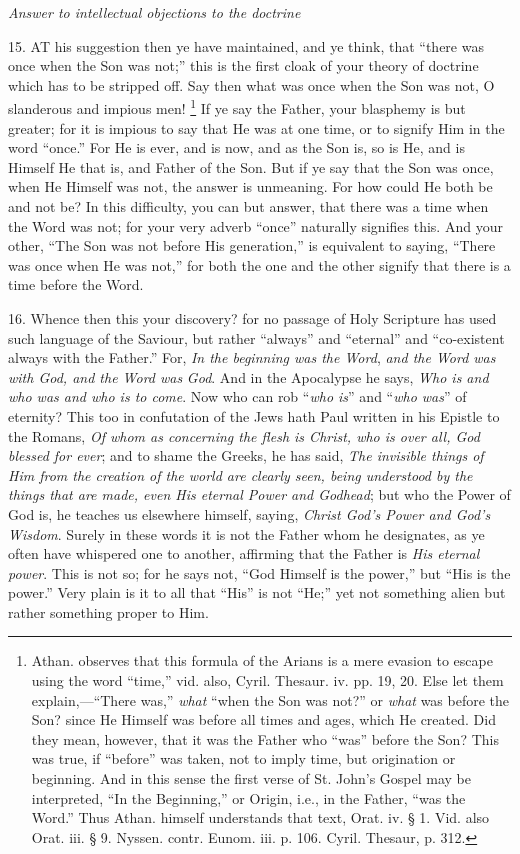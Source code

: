 
\emph{Answer
to intellectual objections to the doctrine}

15. AT
his suggestion then ye have maintained, and ye think, that ``there was
once when the Son was not;'' this is the first cloak of your theory of
doctrine which has to be stripped off. Say then what was once when the
Son was not, O slanderous and impious men! \footnote{Athan. observes that this formula of the Arians is a mere evasion to
escape using the word ``time,'' vid. also, Cyril. Thesaur. iv. pp. 19,
20. Else let them explain,—``There was,'' \emph{what} ``when the Son
was not?'' or \emph{what} was before the Son? since He Himself was
before all times and ages, which He created. Did they mean, however,
that it was the Father who ``was'' before the Son? This was true, if ``before''
was taken, not to imply time, but origination or beginning. And in
this sense the first verse of St. John's Gospel may be interpreted, ``In
the Beginning,'' or Origin, i.e., in the Father, ``was the Word.'' Thus
Athan. himself understands that text, Orat. iv. § 1. Vid. also Orat.
iii. § 9. Nyssen. contr. Eunom. iii. p. 106. Cyril. Thesaur, p. 312.} If ye say the Father, your blasphemy is but greater; for it is
impious to say that He was at one time, or to signify Him in the word ``once.''
For He is ever, and is now, and as the Son is, so is He, and is
Himself He that is, and Father of the Son. But if ye say that the Son
was once, when He Himself was not, the answer is unmeaning. For how
could He both be and not be? In this difficulty, you can but answer,
that there was a time when the Word was not; for your very adverb ``once''
naturally signifies this. And your other, ``The Son was not before His
generation,'' is equivalent to saying, ``There was once when He was not,''
for both the one and the other signify that there is a time before the
Word.

16. Whence then this your
discovery? for no passage of Holy Scripture has used such language of
the Saviour, but rather ``always'' and ``eternal'' and ``co-existent always
with the Father.'' For, \emph{In the beginning was the Word}, \emph{and
the Word was with God, and the Word was} \emph{God}. And in the
Apocalypse he says, \emph{Who is and who was and who is to come}. Now
who can rob ``\emph{who is}'' and ``\emph{who was}'' of eternity? This too
in confutation of the Jews hath Paul written in his Epistle to the
Romans, \emph{Of whom as concerning the flesh is Christ, who is over all,
God blessed for ever}; and to shame the Greeks, he has said, \emph{The
invisible things of Him from the creation of the world are clearly
seen, being understood by the things that are made, even His eternal
Power and Godhead}; but who the Power of God is, he teaches us
elsewhere himself, saying, \emph{Christ God's Power and God's Wisdom}.
Surely in these words it is not the Father whom he designates, as ye
often have whispered one to another, affirming that the Father is \emph{His
eternal power}. This is not so; for he says not, ``God Himself is
the power,'' but ``His is the power.'' Very plain is it to all that ``His''
is not ``He;'' yet not something alien but rather something proper to
Him.

